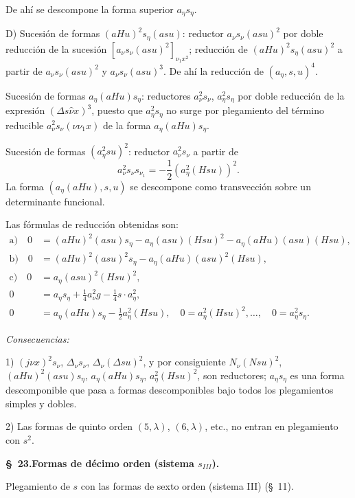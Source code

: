 \documentclass[11pt]{article}
\newcommand{\A}{\Delta}
\begin{document}
De ahí se descompone la forma superior $a_\eta s_\eta$.

D) Sucesión de formas $(aHu)^2s_\eta(asu)$: reductor $a_\nu s_\nu(asu)^2$ por doble reducción de la sucesión $[a_\nu s_\nu(asu)^2]_{\nu_1x^2}$; reducción de $(aHu)^2s_\eta(asu)^2$ a partir de $a_\nu s_\nu(asu)^2$ y $a_\nu s_\nu(asu)^3$. De ahí la reducción de $(a_\eta,s,u)^4$.

Sucesión de formas $a_\eta(aHu)s_\eta$: reductores $a_\nu^2s_\nu$, $a_\eta^2s_\eta$ por doble reducción de la expresión $(\A s\widehat\nu x)^3$, puesto que $a_\eta^2s_\eta$ no surge por plegamiento del término reducible $a_\nu^2s_\nu(\nu\nu_1x)$ de la forma $a_\eta(aHu)s_\eta$.

Sucesión de formas $(a_\eta^2su)^2$: reductor $a_\nu^2s_\nu$ a partir de
\[
a_\nu^2s_\nu s_{\nu_1}=-\frac12(a_\eta^2(Hsu))^2.
\]
La forma $(a_\eta(aHu),s,u)$ se descompone como transvección sobre un determinante funcional.

Las fórmulas de reducción obtenidas son:
\[
\tag{30}
\begin{aligned}
\text{a)}\quad 0&=(aHu)^2(asu)s_\eta-a_\eta(asu)(Hsu)^2-a_\eta(aHu)(asu)(Hsu),\\
\text{b)}\quad 0&=(aHu)^2(asu)^2s_\eta-a_\eta(aHu)(asu)^2(Hsu),\\
\text{c)}\quad 0&=a_\eta(asu)^2(Hsu)^2,\\
0&=a_\eta s_\eta+\frac14a_\nu^2g-\frac14s\cdot a_\eta^2,\\
0&=a_\eta(aHu)s_\eta-\frac12a_\eta^2(Hsu),
\quad 0=a_\eta^2(Hsu)^2,\ldots,
\quad 0=a_\eta^2s_\eta.
\end{aligned}
\]

\noindent\emph{Consecuencias:}

1) $(j\nu x)^2s_\nu$, $\A_\nu s_\nu$, $\A_\nu(\A su)^2$, y por consiguiente $N_\nu(Nsu)^2$, $(aHu)^2(asu)s_\eta$, $a_\eta(aHu)s_\eta$, $a_\eta^2(Hsu)^2$, son reductores; $a_\eta s_\eta$ es una forma descomponible que pasa a formas descomponibles bajo todos los plegamientos simples y dobles.

2) Las formas de quinto orden $(5,\lambda)$, $(6,\lambda)$, etc., no entran en plegamiento con $s^2$.

\begin{center}\textbf{\S\ 23.\quad Formas de décimo orden (sistema $s_{III}$).}\end{center}
Plegamiento de $s$ con las formas de sexto orden (sistema III) (\S\ 11).
\end{document}
